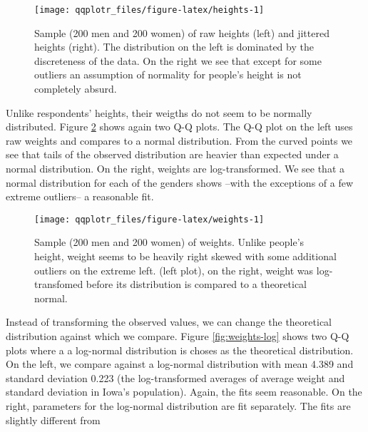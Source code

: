 \begin{Schunk}
\begin{figure}

{\centering \texttt{[image: qqplotr\_files/figure-latex/heights-1]} 

}

\caption[Sample (200 men and 200 women) of raw heights (left) and jittered heights (right)]{Sample (200 men and 200 women) of raw heights (left) and jittered heights (right). The distribution on the left is dominated by the discreteness of the data. On the right we see that except for some outliers an assumption of normality for people's height is not completely absurd.}\label{fig:heights}
\end{figure}
\end{Schunk}

Unlike respondents' heights, their weigths do not seem to be normally
distributed. Figure \ref{fig:weights} shows again two Q-Q plots. The Q-Q
plot on the left uses raw weights and compares to a normal distribution.
From the curved points we see that tails of the observed distribution
are heavier than expected under a normal distribution. On the right,
weights are log-transformed. We see that a normal distribution for each
of the genders shows --with the exceptions of a few extreme outliers-- a
reasonable fit.

\begin{Schunk}
\begin{figure}

{\centering \texttt{[image: qqplotr\_files/figure-latex/weights-1]} 

}

\caption[Sample (200 men and 200 women) of weights]{Sample (200 men and 200 women) of weights. Unlike people's height, weight seems to be heavily right skewed with some additional outliers on the extreme left. (left plot), on the right, weight was log-transfomed before its distribution is compared to a theoretical normal. }\label{fig:weights}
\end{figure}
\end{Schunk}

Instead of transforming the observed values, we can change the
theoretical distribution against which we compare. Figure
\ref{fig:weights-log} shows two Q-Q plots where a a log-normal
distribution is choses as the theoretical distribution. On the left, we
compare against a log-normal distribution with mean 4.389 and standard
deviation 0.223 (the log-transformed averages of average weight and
standard deviation in Iowa's population). Again, the fits seem
reasonable. On the right, parameters for the log-normal distribution are
fit separately. The fits are slightly different from

